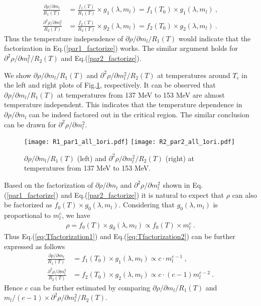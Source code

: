 \documentclass[a4paper,11pt]{article}
\numberwithin{equation}{section}
\begin{document}
\begin{align}
\label{eq:Tfactorization1}
\frac{\partial \rho/\partial m_l}{ R_1(T)} 
&=\frac{f_1(T)}{R_1(T)}\times  g_1(\lambda,m_l)
=f_1(T_0)\times  g_1(\lambda,m_l)
~,
\\
\label{eq:Tfactorization2}
\frac{\partial^2 \rho/\partial m_l^2}{ R_2(T)} 
&=\frac{f_2(T)}{R_2(T)} \times g_2(\lambda,m_l)
=
f_2(T_0)\times
g_2(\lambda,m_l)~.
\end{align}
Thus the temperature independence of ${\partial \rho/\partial m_l} / { R_1(T)}$ would indicate that the factorization in Eq.(\ref{par1_factorize}) works. The similar argument holds for $\partial^2 \rho / \partial m_l^2/R_2(T)$ and Eq.(\ref{par2_factorize}).



We show ${\partial \rho/\partial m_l} / { R_1(T)}$ and ${\partial^2 \rho/\partial m_l^2} / { R_2(T)}$ at temperatures around $T_c$ in the left and right plots of Fig.\ref{fig_par1_factorize}, respectively. It can be observed that ${\partial \rho/\partial m_l} / { R_1(T)}$ at temperatures from 137 MeV to 153 MeV are almost temperature independent. This indicates that the temperature dependence in $\partial \rho / \partial m_l$ can be indeed factored out in the critical region. The similar conclusion can be drawn for $\partial^2 \rho / \partial m_l^2$.


\begin{figure}[htbp]
\texttt{[image: R1\_par1\_all\_1ori.pdf]}
\texttt{[image: R2\_par2\_all\_1ori.pdf]}
\caption{${\partial \rho/\partial m_l} / { R_1(T)}$ (left) and ${\partial^2 \rho/\partial m_l^2} / { R_2(T)}$ (right) at temperatures from 137 MeV to 153 MeV.}
\label{fig_par1_factorize}
\end{figure}












Based on the factorization of ${\partial \rho/\partial m_l}$ and ${\partial^2 \rho/\partial m_l^2}$  shown in Eq.(\ref{par1_factorize}) and Eq.(\ref{par2_factorize}) it is natural to expect that $\rho$ can also be factorized as $f_0(T) \times g_0(\lambda,m_l )$. Considering that $g_0(\lambda,m_l )$ is proportional to $m^c_l$, we have
\begin{align}
\rho =f_0(T)\times g_0(\lambda,m_l)
 \propto f_0(T) \times {  m^c_l}
 ~.
\end{align}
Thus Eq.(\ref{eq:Tfactorization1}) and Eq.(\ref{eq:Tfactorization2}) can be further expressed as follows
\begin{align}
\frac{\partial \rho/\partial m_l}{ R_1(T)} 
&=f_1(T_0)\times  g_1(\lambda,m_l)
\propto{ c \cdot m_l^{c-1}}~,
\\
\frac{\partial^2 \rho/\partial m_l^2}{ R_2(T)} 
&=
f_2(T_0)\times
g_2(\lambda,m_l)\propto
{  c\cdot (c-1) m_l^{c-2} }
~.
\end{align}
Hence $c$ can be further estimated by comparing
$\partial \rho/\partial m_l/R_1(T)$ and $m_l/(c-1) \times \partial^2 \rho/\partial m_l^2/R_2(T)$.
\end{document}
